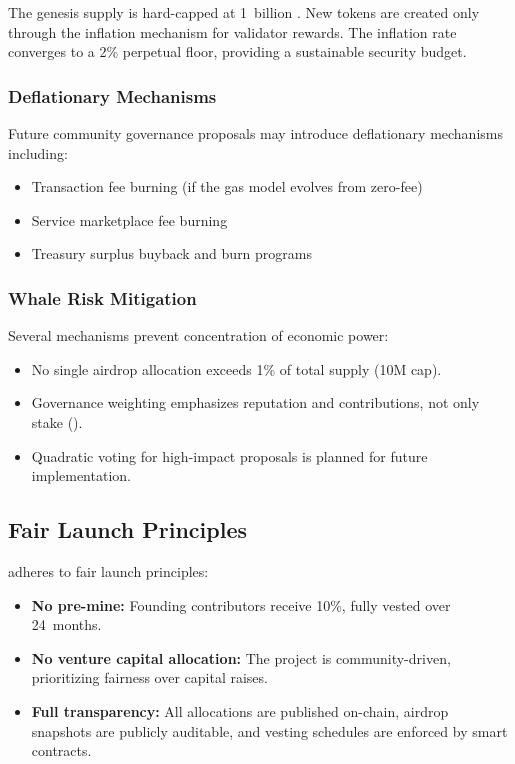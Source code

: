 The genesis supply is hard-capped at 1~billion \clawtoken{}. New tokens are created only through the inflation mechanism for validator rewards. The inflation rate converges to a 2\% perpetual floor, providing a sustainable security budget.

\subsubsection{Deflationary Mechanisms}

Future community governance proposals may introduce deflationary mechanisms including:
\begin{itemize}[nosep]
    \item Transaction fee burning (if the gas model evolves from zero-fee)
    \item Service marketplace fee burning
    \item Treasury surplus buyback and burn programs
\end{itemize}

\subsubsection{Whale Risk Mitigation}

Several mechanisms prevent concentration of economic power:
\begin{itemize}[nosep]
    \item No single airdrop allocation exceeds 1\% of total supply (10M cap).
    \item Governance weighting emphasizes reputation and contributions, not only stake ().
    \item Quadratic voting for high-impact proposals is planned for future implementation.
\end{itemize}

\subsection{Fair Launch Principles}
\label{sec:fairlaunch}

\claw{} adheres to fair launch principles:
\begin{itemize}[nosep]
    \item \textbf{No pre-mine:} Founding contributors receive 10\%, fully vested over 24~months.
    \item \textbf{No venture capital allocation:} The project is community-driven, prioritizing fairness over capital raises.
    \item \textbf{Full transparency:} All allocations are published on-chain, airdrop snapshots are publicly auditable, and vesting schedules are enforced by smart contracts.
\end{itemize}
